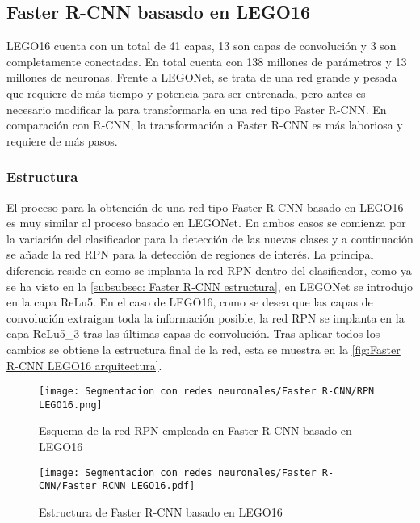 \newpage
\subsection{Faster R-CNN basasdo en LEGO16}
LEGO16 cuenta con un total de 41 capas, 13 son capas de convolución y 3 son completamente conectadas. En total cuenta con 138 millones de parámetros y 13 millones de neuronas. Frente a LEGONet, se trata de una red grande y pesada que requiere de más tiempo y potencia para ser entrenada, pero antes es necesario modificar la para transformarla en una red tipo Faster R-CNN. En comparación con R-CNN, la transformación a Faster R-CNN es más laboriosa y requiere de más pasos.

\subsubsection*{Estructura}
El proceso para la obtención de una red tipo Faster R-CNN basado en LEGO16 es muy similar al proceso basado en LEGONet. En ambos casos se comienza por la variación del clasificador para la detección de las nuevas clases y a continuación se añade la red RPN para la detección de regiones de interés. La principal diferencia reside en como se implanta la red RPN dentro del clasificador, como ya se ha visto en la \autoref{subsubsec: Faster R-CNN estructura}, en LEGONet se introdujo en la capa ReLu5. En el caso de LEGO16, como se desea que las capas de convolución extraigan toda la información posible, la red RPN se implanta en la capa ReLu5\_3 tras las últimas capas de convolución. Tras aplicar todos los cambios se obtiene la estructura final de la red, esta se muestra en la \autoref{fig:Faster R-CNN LEGO16 arquitectura}.


\begin{figure}[ht]  %
	\centering
	\texttt{[image: Segmentacion con redes neuronales/Faster R-CNN/RPN LEGO16.png]}
	\caption{Esquema de la red RPN empleada en Faster R-CNN basado en LEGO16}
	\label{fig:Faster R-CNN RPN LEGO16}
\end{figure}

\begin{figure}[ht]  %
	\centering
	\texttt{[image: Segmentacion con redes neuronales/Faster R-CNN/Faster\_RCNN\_LEGO16.pdf]}
	\caption{Estructura de Faster R-CNN basado en LEGO16}
	\label{fig:Faster R-CNN LEGO16 arquitectura}
\end{figure}


